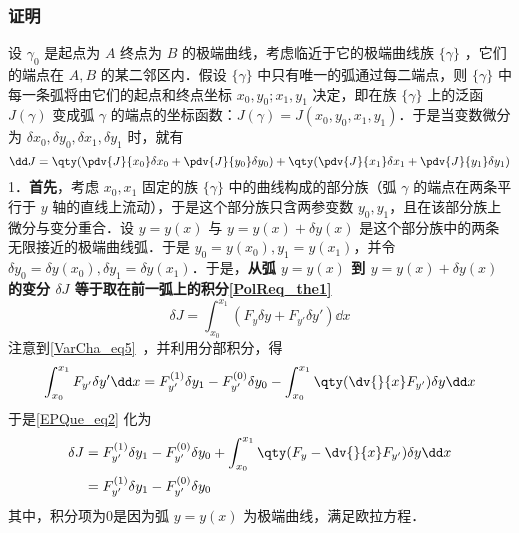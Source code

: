 \subsubsection{证明}
设 $\gamma_0$ 是起点为 $A$ 终点为 $B$ 的极端曲线，考虑临近于它的极端曲线族 $\{\gamma\}$ ，它们的端点在 $A,B$ 的某二邻区内．假设 $\{\gamma\}$ 中只有唯一的弧通过每二端点，则 $\{\gamma\}$ 中每一条弧将由它们的起点和终点坐标 $x_0,y_0;x_1,y_1$ 决定，即在族 $\{\gamma\}$ 上的泛函 $J(\gamma)$ 变成弧 $\gamma$ 的端点的坐标函数：$J(\gamma)=J(x_0,y_0,x_1,y_1)$．于是当变数微分为 $\delta x_0,\delta y_0,\delta x_1,\delta y_1$ 时，就有
\begin{equation}
\dd J=\qty(\pdv{J}{x_0}\delta x_0+\pdv{J}{y_0}\delta y_0)+\qty(\pdv{J}{x_1}\delta x_1+\pdv{J}{y_1}\delta y_1)
\end{equation}
1．\textbf{首先}，考虑 $x_0,x_1$ 固定的族 $\{\gamma\}$ 中的曲线构成的部分族（弧 $\gamma$ 的端点在两条平行于 $y$ 轴的直线上流动），于是这个部分族只含两参变数 $y_0,y_1$，且在该部分族上微分与变分重合．设 $y=y(x)$ 与 $y=y(x)+\delta y(x)$ 是这个部分族中的两条无限接近的极端曲线弧．于是 $y_0=y(x_0),y_1=y(x_1)$，并令 $\delta y_0=\delta y(x_0),\delta y_1=\delta y(x_1)$．于是，\textbf{从弧 $y=y(x)$ 到 $y=y(x)+\delta y(x)$ 的变分 $\delta J$ 等于取在前一弧上的积分\autoref{PolReq_the1}~}
\begin{equation}\label{EPQue_eq2}
\delta J=\int_{x_0}^{x_1}(F_{y}\delta y+F_{y'}\delta y')\dd x
\end{equation}
注意到\autoref{VarCha_eq5}~，并利用分部积分，得
\begin{equation}
\int_{x_0}^{x_1}F_{y'}\delta y' \dd x=F_{y'}^{(1)}\delta y_1-F_{y'}^{(0)}\delta y_0-\int_{x_0}^{x_1}\qty(\dv{}{x}F_{y'})\delta y\dd x
\end{equation}
于是\autoref{EPQue_eq2} 化为
\begin{equation}
\begin{aligned}
\delta J&=F_{y'}^{(1)}\delta y_1-F_{y'}^{(0)}\delta y_0+\int_{x_0}^{x_1}\qty(F_y-\dv{}{x}F_{y'})\delta y\dd x\\
&=F_{y'}^{(1)}\delta y_1-F_{y'}^{(0)}\delta y_0
\end{aligned}
\end{equation}
其中，积分项为0是因为弧 $y=y(x)$ 为极端曲线，满足欧拉方程．

